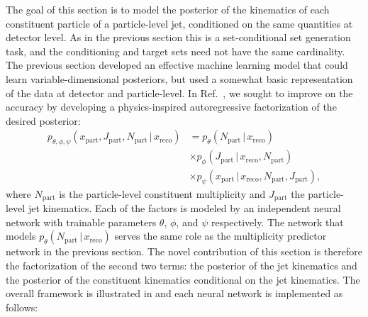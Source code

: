 The goal of this section is to model the posterior of the kinematics of each constituent particle of a particle-level jet, conditioned on the same quantities at detector level.
As in the previous section this is a set-conditional set generation task, and the conditioning and target sets need not have the same cardinality.
The previous section developed an effective machine learning model that could learn variable-dimensional posteriors, but used a somewhat basic representation of the data at detector and particle-level.
In Ref.~\cite{Petitjean:2025tgk}, we sought to improve on the accuracy by developing a physics-inspired autoregressive factorization of the desired posterior:
\begin{align}
  p_{\theta,\phi,\psi}(x_\text{part}, J_\text{part}, N_\text{part} \,|\, x_\text{reco}) &=
  p_\theta(N_\text{part} \,|\, x_\text{reco}) \nonumber \\
  &\times p_\phi(J_\text{part} \,|\, x_\text{reco}, N_\text{part}) \nonumber \\
  &\times p_\psi(x_\text{part} \,|\, x_\text{reco}, N_\text{part}, J_\text{part}),
  \label{eq:cfm_factorization}
\end{align}
where $N_\text{part}$ is the particle-level constituent multiplicity and $J_\text{part}$ the particle-level jet kinematics.
Each of the factors is modeled by an independent neural network with trainable parameters $\theta$, $\phi$, and $\psi$ respectively.
The network that models $p_\theta(N_\text{part} \,|\, x_\text{reco})$ serves the same role as the multiplicity predictor network in the previous section.
The novel contribution of this section is therefore the factorization of the second two terms: the posterior of the jet kinematics and the posterior of the constituent kinematics conditional on the jet kinematics.
The overall framework is illustrated in  and each neural network is implemented as follows:
